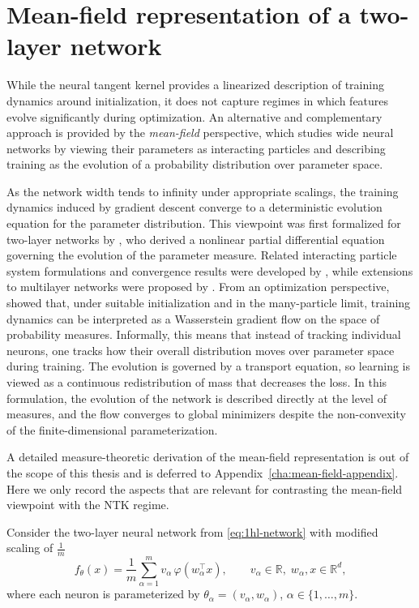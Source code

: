\section{Mean-field representation of a two-layer network}

While the neural tangent kernel provides a linearized description of training
dynamics around initialization, it does not capture regimes in which features
evolve significantly during optimization. An alternative and complementary
approach is provided by the \emph{mean-field} perspective, which studies wide
neural networks by viewing their parameters as interacting particles and
describing training as the evolution of a probability distribution over
parameter space.

As the network width tends to infinity under appropriate scalings, the training
dynamics induced by gradient descent converge to a deterministic evolution
equation for the parameter distribution. This viewpoint was first formalized
for two-layer networks by \citet{Mei2018meanfieldview}, who derived a nonlinear
partial differential equation governing the evolution of the parameter measure.
Related interacting particle system formulations and convergence results were
developed by \citet{Rotskoff_2022}, while extensions to multilayer networks
were proposed by \citet{nguyen2019meanfieldlimitlearning}. From an
optimization perspective, \citet{chizat2018globalconvergencegradientdescent}
showed that, under suitable initialization and in the many-particle limit,
training dynamics can be interpreted as a Wasserstein gradient flow on the
space of probability measures.  Informally, this means that instead of tracking
individual neurons, one tracks how their overall distribution moves over
parameter space during training. The evolution is governed by a transport
equation, so learning is viewed as a continuous redistribution of mass that
decreases the loss. In this formulation, the evolution
of the network is described directly at the level of measures, and the flow
converges to global minimizers despite the non-convexity of the
finite-dimensional parameterization.

A detailed measure-theoretic derivation of the mean-field representation is out
of the scope of this thesis and is deferred to
Appendix~\ref{cha:mean-field-appendix}. Here we only record the aspects that are
relevant for contrasting the mean-field viewpoint with the NTK regime.

Consider the two-layer neural network from \eqref{eq:1hl-network} with modified scaling of $\frac{1}{m}$
\begin{equation}
	f_\theta(x)
	=
	\frac{1}{m}
	\sum_{\alpha=1}^m
	v_\alpha\,\varphi(w_\alpha^\top x),
	\qquad
	v_\alpha \in \mathbb{R}, \;
	w_\alpha, x \in \mathbb{R}^d,
	\label{eq:mf-finite-network}
\end{equation}
where each neuron is parameterized by
\(
\theta_\alpha = (v_\alpha, w_\alpha)
\), $\alpha \in \{1,\ldots,m\}$.

